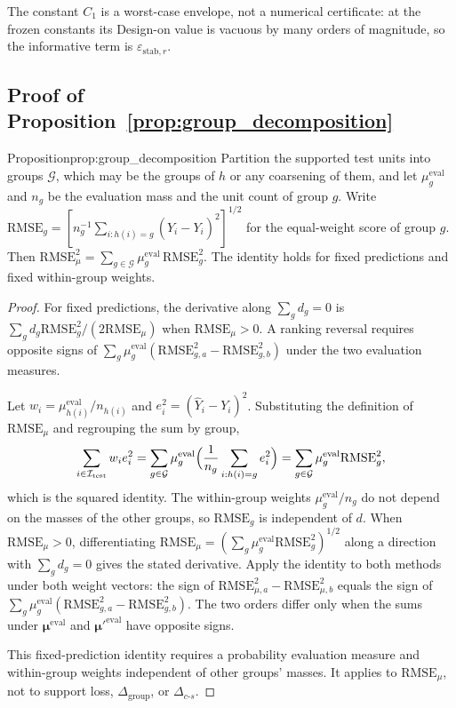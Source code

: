 The constant $C_1$ is a worst-case envelope, not a numerical certificate: at
the frozen constants its Design-on value is vacuous by many orders of
magnitude, so the informative term is $\varepsilon_{\mathrm{stab},r}$.


\subsection{Proof of Proposition~\ref{prop:group_decomposition}}
\begin{restated}{Proposition}{prop:group_decomposition}
Partition the supported test units into groups $\mathcal G$, which may be the
groups of $h$ or any coarsening of them, and let $\mu^{\mathrm{eval}}_g$ and
$n_g$ be the evaluation mass and the unit count of group $g$.  Write
$\mathrm{RMSE}_g=[n_g^{-1}\sum_{i:h(i)=g}(\widehat Y_i-Y_i)^2]^{1/2}$ for the
equal-weight score of group $g$.  Then
$\mathrm{RMSE}_{\mu}^2=\sum_{g\in\mathcal G}\mu^{\mathrm{eval}}_g\,\mathrm{RMSE}_g^2$.
The identity holds for fixed predictions and fixed within-group weights.
\end{restated}
\begin{proof}


For fixed predictions, the derivative along $\sum_gd_g=0$ is
$\sum_gd_g\mathrm{RMSE}_g^2/(2\mathrm{RMSE}_{\mu})$ when
$\mathrm{RMSE}_{\mu}>0$.  A ranking reversal requires opposite signs of
$\sum_g\mu_g^{\mathrm{eval}}(\mathrm{RMSE}_{g,a}^2-\mathrm{RMSE}_{g,b}^2)$
under the two evaluation measures.

  Let $w_i=\mu^{\mathrm{eval}}_{h(i)}/n_{h(i)}$ and
$e_i^2=(\widehat Y_i-Y_i)^2$.  Substituting the definition of
$\mathrm{RMSE}_{\mu}$ and regrouping the sum by group,
\[
 \sum_{i\in\mathcal I_{\mathrm{test}}}w_ie_i^2
 =\sum_{g\in\mathcal G}\mu^{\mathrm{eval}}_g
   \Bigl(\frac1{n_g}\sum_{i:h(i)=g}e_i^2\Bigr)
 =\sum_{g\in\mathcal G}\mu^{\mathrm{eval}}_g\mathrm{RMSE}_g^2 ,
\]
which is the squared identity.  The within-group weights
$\mu^{\mathrm{eval}}_g/n_g$ do not depend on the masses of the other groups, so
$\mathrm{RMSE}_g$ is independent of $d$.  When $\mathrm{RMSE}_{\mu}>0$, differentiating
$\mathrm{RMSE}_{\mu}=(\sum_g\mu^{\mathrm{eval}}_g\mathrm{RMSE}_g^2)^{1/2}$ along a
direction with $\sum_gd_g=0$ gives the stated derivative.  Apply the identity
to both methods under both weight vectors: the sign of
$\mathrm{RMSE}_{\mu,a}^2-\mathrm{RMSE}_{\mu,b}^2$ equals the sign of
$\sum_g\mu^{\mathrm{eval}}_g(\mathrm{RMSE}_{g,a}^2-\mathrm{RMSE}_{g,b}^2)$.
The two orders differ only when the sums under
$\boldsymbol\mu^{\mathrm{eval}}$ and $\boldsymbol\mu'^{\mathrm{eval}}$
have opposite signs.


This fixed-prediction identity requires a probability evaluation measure and
within-group weights independent of other groups' masses. It applies to
$\mathrm{RMSE}_{\mu}$, not to support loss, $\Delta_{\mathrm{group}}$, or
$\Delta_{c\text{-}s}$.
\end{proof}

